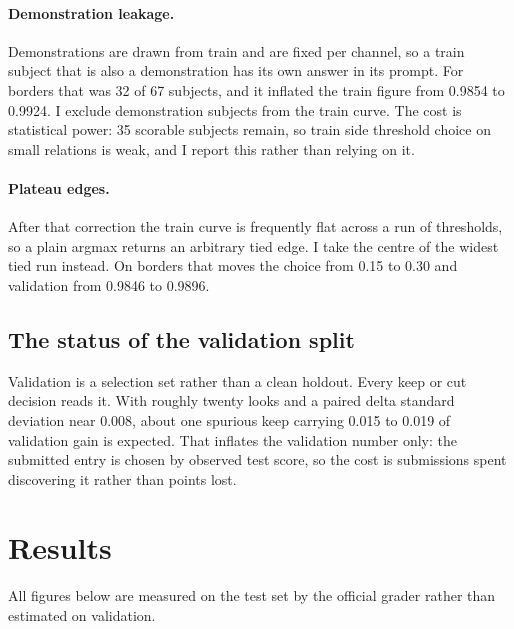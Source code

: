 \documentclass[11pt]{article}
\begin{document}
\paragraph{Demonstration leakage.} Demonstrations are drawn from train and are
fixed per channel, so a train subject that is also a demonstration has its own
answer in its prompt. For borders that was 32 of 67 subjects, and it inflated the
train figure from 0.9854 to 0.9924. I exclude demonstration subjects from the
train curve. The cost is statistical power: 35 scorable subjects remain, so train
side threshold choice on small relations is weak, and I report this rather than
relying on it.

\paragraph{Plateau edges.} After that correction the train curve is frequently
flat across a run of thresholds, so a plain argmax returns an arbitrary tied
edge. I take the centre of the widest tied run instead. On borders that moves the
choice from 0.15 to 0.30 and validation from 0.9846 to 0.9896.

\subsection{The status of the validation split}

Validation is a selection set rather than a clean holdout. Every keep or cut
decision reads it. With roughly twenty looks and a paired delta standard
deviation near 0.008, about one spurious keep carrying 0.015 to 0.019 of
validation gain is expected. That inflates the validation number only: the
submitted entry is chosen by observed test score, so the cost is submissions
spent discovering it rather than points lost.

\section{Results}

All figures below are measured on the test set by the official grader rather than
estimated on validation.
\end{document}
